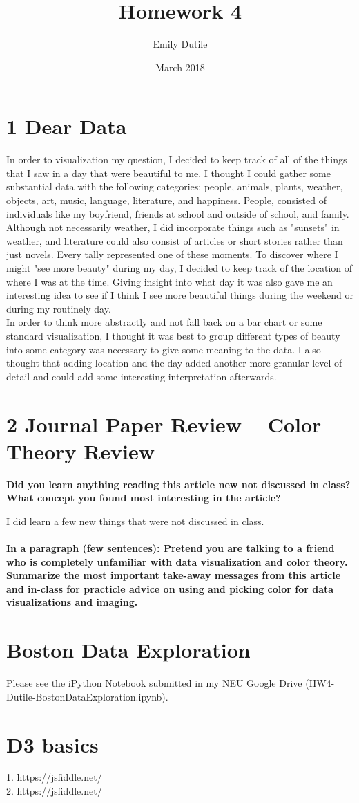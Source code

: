 \documentclass{neu_handout}
\title{Homework 4}
\author{Emily Dutile}
\date{March 2018}
\begin{document}
\section*{1 Dear Data}

In order to visualization my question, I decided to keep track of all of the things that I saw in a day that were beautiful to me. I thought I could gather some substantial data with the following categories: people, animals, plants, weather, objects, art, music, language, literature, and happiness. People, consisted of individuals like my boyfriend, friends at school and outside of school, and family. Although not necessarily weather, I did incorporate things such as "sunsets" in weather, and literature could also consist of articles or short stories rather than just novels. Every tally represented one of these moments. To discover where I might "see more beauty" during my day, I decided to keep track of the location of where I was at the time. Giving insight into what day it was also gave me an interesting idea to see if I think I see more beautiful things during the weekend or during my routinely day.\\

In order to think more abstractly and not fall back on a bar chart or some standard visualization, I thought it was best to group different types of beauty into some category was necessary to give some meaning to the data. I also thought that adding location and the day added another more granular level of detail and could add some interesting interpretation afterwards.

\section*{2 Journal Paper Review – Color Theory Review}

\textbf{Did you learn anything reading this article new not discussed in class?  What concept you found most interesting in the article?}

I did learn a few new things that were not discussed in class.\\\\

\textbf{In a paragraph (few sentences): Pretend you are talking to a friend who is completely unfamiliar with data visualization and color theory.  Summarize the most important take-away messages from this article and in-class for practicle advice on using and picking color for data visualizations and imaging.}

\section*{Boston Data Exploration}

Please see the iPython Notebook submitted in my NEU Google Drive (HW4-Dutile-BostonDataExploration.ipynb).

\section*{D3 basics}

1. https://jsfiddle.net/ \\

2. https://jsfiddle.net/
\end{document}
